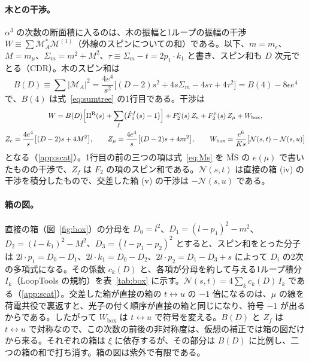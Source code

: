 \documentclass[a4paper,10pt]{ltjsarticle}
\newcommand{\MSbar}{\overline{\mathrm{MS}}}
\begin{document}
\paragraph{木との干渉。}$\alpha^3$ の次数の断面積に入るのは、木の振幅と1ループの振幅の干渉 $W\equiv\sum\mathcal M_A^*\mathcal M^{(1)}$（外線のスピンについての和）である。以下、$m=m_e$、$M=m_\mu$、$\Sigma_m=m^2+M^2$、$\tau\equiv\Sigma_m-t=2p_1\cdot k_1$ と書き、スピン和も $D$ 次元でとる（CDR）。木のスピン和は
\begin{equation*}
B(D)\equiv\sum|\mathcal M_A|^2=\frac{4e^4}{s^2}\bigl[(D-2)s^2+4s\Sigma_m-4s\tau+4\tau^2\bigr]=B(4)-8\epsilon e^4
\end{equation*}
で、$B(4)$ は式~\eqref{eq:sumtree} の1行目である。干渉は
\begin{equation}
\begin{gathered}
W=B(D)\Bigl[\Pi^{\mathrm R}(s)+\sum_f\bigl(\hat F_1^f(s)-1\bigr)\Bigr]+F_2^e(s)\,Z_e+F_2^\mu(s)\,Z_\mu+W_{\mathrm{box}},\\
Z_e=\frac{4e^4}{s}\bigl[(D-2)s+4M^2\bigr],\qquad Z_\mu=\frac{4e^4}{s}\bigl[(D-2)s+4m^2\bigr],\qquad
W_{\mathrm{box}}=\frac{e^6}{Ks}\bigl[\mathcal N(s,t)-\mathcal N(s,u)\bigr]
\end{gathered}
\label{eq:Wbox}
\end{equation}
となる（\ref{app:scat}）。1行目の前の三つの項は式~\eqref{eq:Ms} を $\MSbar$ の $e(\mu)$ で書いたものの干渉で、$Z_f$ は $F_2$ の項のスピン和である。$\mathcal N(s,t)$ は直接の箱 (iv) の干渉を積分したもので、交差した箱 (v) の干渉は $-\mathcal N(s,u)$ である。

\paragraph{箱の図。}直接の箱（図~\ref{fig:box}）の分母を $D_0=l^2$、$D_1=(l-p_1)^2-m^2$、$D_2=(l-k_1)^2-M^2$、$D_3=(l-p_1-p_2)^2$ とすると、スピン和をとった分子は $2l\cdot p_1=D_0-D_1$、$2l\cdot k_1=D_0-D_2$、$2l\cdot p_2=D_1-D_3+s$ によって $D_i$ の2次の多項式になる。その係数 $c_k(D)$ と、各項が分母を約して与える1ループ積分 $I_k$（LoopTools の規約）を表~\ref{tab:box} に示す。$\mathcal N(s,t)=4\sum_kc_k(D)\,I_k$ である（\ref{app:scat}）。交差した箱が直接の箱の $t\leftrightarrow u$ の $-1$ 倍になるのは、$\mu$ の線を荷電共役で裏返すと、光子の付く順序が直接の箱と同じになり、符号 $-1$ が出るからである。したがって $W_{\mathrm{box}}$ は $t\leftrightarrow u$ で符号を変える。$B(D)$ と $Z_f$ は $t\leftrightarrow u$ で対称なので、この次数の前後の非対称度は、仮想の補正では箱の図だけから来る。それぞれの箱は $\xi$ に依存するが、その部分は $B(D)$ に比例し、二つの箱の和で打ち消す。箱の図は紫外で有限である。
\end{document}
